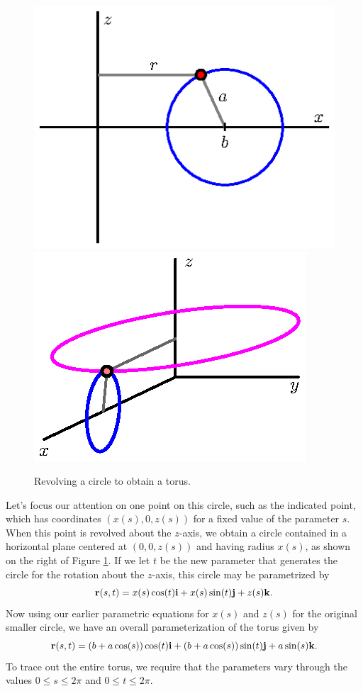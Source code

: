 \begin{example}
\begin{figure}[ht]
  \begin{center}
    \includegraphics{figures/fig_11_6_torus_cross.eps}
    \hspace*{20pt}
    \includegraphics{figures/fig_11_6_torus_revolve.eps}
  \end{center}
  \caption{Revolving a circle to obtain a torus.}
  \label{F:11.6.torus.revolve}
\end{figure}

Let's focus our attention on one point on this circle, such as the
indicated point, which has coordinates $(x(s), 0, z(s))$
for a fixed value of the 
parameter $s$.  When this point is revolved about the $z$-axis, we
obtain a circle contained in a horizontal plane centered at
$(0,0,z(s))$ and having radius $x(s)$, as shown on the right of Figure
\ref{F:11.6.torus.revolve}.  If we let $t$ be the new parameter that generates the circle for the rotation about the $z$-axis, this circle may be
parametrized by
$$
\mathbf{r}(s,t) = x(s)\cos(t)\mathbf{i} + x(s)\sin(t)\mathbf{j} + z(s)\mathbf{k}.
$$
Now using our earlier parametric equations for $x(s)$ and $z(s)$ for the original smaller circle, we have an overall parameterization of the torus given by
$$
\mathbf{r}(s,t) =(b+a\cos(s))\cos(t)\mathbf{i} + 
(b+a\cos(s))\sin(t)\mathbf{j} + 
a\sin(s)\mathbf{k}.
$$
To trace out the entire torus, we require that the parameters vary through the values $0\leq s\leq 2\pi$ and
$0\leq t\leq 2\pi$.

\end{example}

